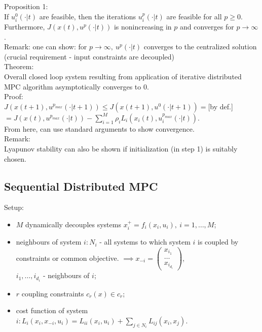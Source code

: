     Proposition 1:\\
    If $u_i^0(\cdot|t)$ are feasible, then the iterations $u_i^p(\cdot|t)$ are feasible for all $p \ge 0$. \\
    Furthermore, $J(x(t),u^p(\cdot|t))$ is nonincreasing in $p$ and converges for $p \rightarrow \infty$.\\
    
    Remark: one can show: for $p \rightarrow \infty, \ u^p(\cdot|t)$ converges to the centralized solution (crucial requirement - input constraints are decoupled) \\
    
    Theorem:\\
    Overall closed loop system resulting from application of iterative distributed MPC algorithm asymptotically converges to 0.\\
    
    Proof:\\
    $J(x(t+1),u^{p_{max}}(\cdot|t+1)) \le J(x(t+1),u^0(\cdot|t+1)) = $[by def.] $= J(x(t),u^{p_{max}}(\cdot|t)) - \sum_{i=1}^M \rho_i L_i (x_i(t),u_i^{p_{max}}(\cdot|t))$.\\
    From here, can use standard arguments to show convergence.\\
    
    Remark:\\
    Lyapunov stability can also be shown if initialization (in step 1) is suitably chosen.\\
    
\subsection{Sequential Distributed MPC}

    Setup: \begin{itemize}
        \item $M$ dynamically decouples systems $x_i^+=f_i(x_i,u_i), \ i=1,\dots, M$;
        \item neighbours of system $i: N_i$ - all systems to which system $i$ is coupled by constraints or common objective.
    $\implies x_{-i} = \begin{pmatrix}
    x_{i_1} \\
    \dots \\
    x_{i_{d_i}}
    \end{pmatrix}$,\\
    $i_1, \dots, i_{d_i}$ - neighbours of $i$;
    \item $r$ coupling constraints $c_r(x) \in c_r$;
    \item cost function of system $i: L_i(x_i,x_{-i},u_i) = L_{ii}(x_i,u_i)+\sum_{j \in N_i} L_{ij}(x_i,x_j)$.\\
    \end{itemize}
    

